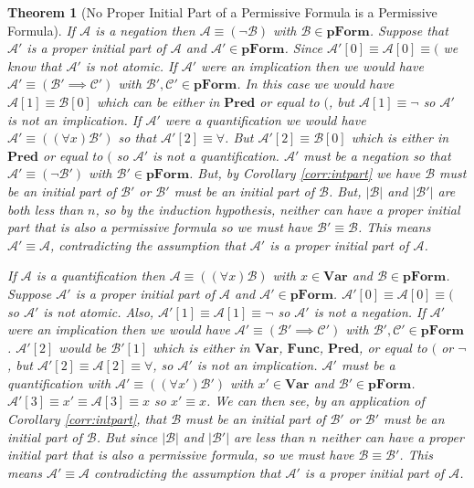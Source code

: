 \documentclass[12pt]{article}
\theoremstyle{break}
\theoremstyle{break}
\newtheorem{theorem}{Theorem}[section]
\theoremstyle{break}
\theoremstyle{break}
\theoremstyle{break}
\newtheorem{informal definition}[definition]{Informal Definition}
\newcommand{\mc}[1]{\mathcal{#1}}
\begin{document}
\begin{theorem}[No Proper Initial Part of a Permissive Formula is a Permissive Formula]
If $\mc{A}$ is a negation then $\mc{A} \equiv (\lnot \mc{B})$ with $\mc{B} \in \textbf{pForm}$.
Suppose that $\mc{A}'$ is a proper initial part of $\mc{A}$ and $\mc{A}'\in\textbf{pForm}$.
Since $\mc{A}'[0] \equiv \mc{A}[0] \equiv ($ we know that $\mc{A}'$ is not atomic.
If $\mc{A}'$ were an implication then we would have $\mc{A}' \equiv (\mc{B}' \implies \mc{C}')$ with $\mc{B}', \mc{C}' \in \textbf{pForm}$.
In this case we would have $\mc{A}[1] \equiv \mc{B}[0]$ which can be either in $\textbf{Pred}$ or equal to $($, but $\mc{A}[1] \equiv \lnot$ so $\mc{A}'$ is not an implication.
If $\mc{A}'$ were a quantification we would have $\mc{A}' \equiv ((\forall x) \mc{B}')$ so that $\mc{A}'[2] \equiv \forall$. But $\mc{A}'[2] \equiv \mc{B}[0]$ which is either in $\textbf{Pred}$ or equal to $($ so $\mc{A}'$ is not a quantification.
$\mc{A}'$ must be a negation so that $\mc{A}' \equiv (\lnot \mc{B}')$ with $\mc{B}' \in \textbf{pForm}$.
But, by Corollary \ref{corr:intpart} we have $\mc{B}$ must be an initial part of $\mc{B}'$ or $\mc{B}'$ must be an initial part of $\mc{B}$.
But, $|\mc{B}|$ and $|\mc{B}'|$ are both less than $n$, so by the induction hypothesis, neither can have a proper initial part that is also a permissive formula so we must have $\mc{B}' \equiv \mc{B}$.
This means $\mc{A}' \equiv \mc{A}$, contradicting the assumption that $\mc{A}'$ is a proper initial part of $\mc{A}$.

If $\mc{A}$ is a quantification then $\mc{A} \equiv ((\forall x) \mc{B})$ with $x \in \textbf{Var}$ and $\mc{B} \in \textbf{pForm}$.
Suppose $\mc{A}'$ is a proper initial part of $\mc{A}$ and $\mc{A}' \in \textbf{pForm}$.
$\mc{A}'[0] \equiv \mc{A}[0] \equiv ($ so $\mc{A}'$ is not atomic.
Also, $\mc{A}'[1] \equiv \mc{A}[1] \equiv \lnot$ so $\mc{A}'$ is not a negation.
If $\mc{A}'$ were an implication then we would have $\mc{A}' \equiv (\mc{B}' \implies \mc{C}')$ with $\mc{B}', \mc{C}' \in \textbf{pForm}$.
$\mc{A}'[2]$ would be $\mc{B}'[1]$ which is either in $\textbf{Var}$, $\textbf{Func}$, $\textbf{Pred}$, or equal to $($ or $\lnot$, but $\mc{A}'[2] \equiv \mc{A}[2] \equiv \forall$, so $\mc{A}'$ is not an implication.
$\mc{A}'$ must be a quantification with $\mc{A}' \equiv ((\forall x') \mc{B}')$ with $x' \in \textbf{Var}$ and $\mc{B}' \in \textbf{pForm}$.
$\mc{A}'[3] \equiv x' \equiv \mc{A}[3] \equiv x$ so $x' \equiv x$.
We can then see, by an application of Corollary \ref{corr:intpart}, that $\mc{B}$ must be an initial part of $\mc{B}'$ or $\mc{B}'$ must be an initial part of $\mc{B}$.
But since $|\mc{B}|$ and $|\mc{B}'| $ are less than $n$ neither can have a proper initial part that is also a permissive formula, so we must have $\mc{B} \equiv \mc{B}'$.
This means $\mc{A}' \equiv \mc{A}$ contradicting the assumption that $\mc{A}'$ is a proper initial part of $\mc{A}$.
\end{theorem}
\end{document}
